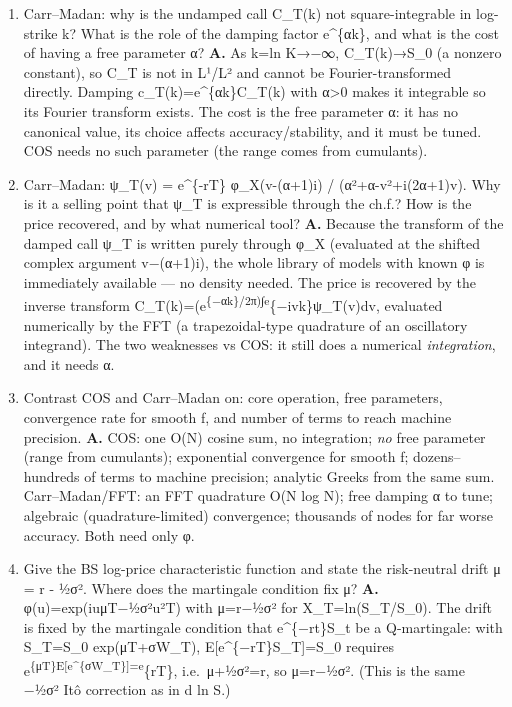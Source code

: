 \documentclass[
  11pt,
]{article}
\begin{document}
\begin{enumerate}
  the even extension. Why does the even extension kill the sine terms?
  \textbf{A.} A function on {[}0,L{]} has a full Fourier series with sin
  and cos terms. Extending it \emph{evenly} to {[}−L,L{]} makes it an
  even function; since sin is odd, all sine coefficients b\_n=(2/L)∫f
  sin vanish, leaving the half-range cosine series f(x)=a\_0/2+Σ a\_n
  cos(nπx/L), a\_n=(2/L)∫\_0\^{}L f cos(nπx/L)dx. COS uses this on
  {[}a,b{]} (shift x↦x−a, period 2(b−a)); the cosine basis gives real
  coefficients read directly off φ.
\item
  Carr--Madan: why is the undamped call C\_T(k) not square-integrable in
  log-strike k? What is the role of the damping factor e\^{}\{αk\}, and
  what is the cost of having a free parameter α? \textbf{A.} As k=ln
  K→−∞, C\_T(k)→S\_0 (a nonzero constant), so C\_T is not in L¹/L² and
  cannot be Fourier-transformed directly. Damping
  c\_T(k)=e\^{}\{αk\}C\_T(k) with α\textgreater0 makes it integrable so
  its Fourier transform exists. The cost is the free parameter α: it has
  no canonical value, its choice affects accuracy/stability, and it must
  be tuned. COS needs no such parameter (the range comes from
  cumulants).
\item
  Carr--Madan: ψ\_T(v) = e\^{}\{-rT\} φ\_X(v-(α+1)i) /
  (α²+α-v²+i(2α+1)v). Why is it a selling point that ψ\_T is expressible
  through the ch.f.? How is the price recovered, and by what numerical
  tool? \textbf{A.} Because the transform of the damped call ψ\_T is
  written purely through φ\_X (evaluated at the shifted complex argument
  v−(α+1)i), the whole library of models with known φ is immediately
  available --- no density needed. The price is recovered by the inverse
  transform C\_T(k)=(e\textsuperscript{\{−αk\}/2π)∫e}\{−ivk\}ψ\_T(v)dv,
  evaluated numerically by the FFT (a trapezoidal-type quadrature of an
  oscillatory integrand). The two weaknesses vs COS: it still does a
  numerical \emph{integration}, and it needs α.
\item
  Contrast COS and Carr--Madan on: core operation, free parameters,
  convergence rate for smooth f, and number of terms to reach machine
  precision. \textbf{A.} COS: one O(N) cosine sum, no integration;
  \emph{no} free parameter (range from cumulants); exponential
  convergence for smooth f; dozens--hundreds of terms to machine
  precision; analytic Greeks from the same sum. Carr--Madan/FFT: an FFT
  quadrature O(N log N); free damping α to tune; algebraic
  (quadrature-limited) convergence; thousands of nodes for far worse
  accuracy. Both need only φ.
\item
  Give the BS log-price characteristic function and state the
  risk-neutral drift μ = r - ½σ². Where does the martingale condition
  fix μ? \textbf{A.} φ(u)=exp(iuμT−½σ²u²T) with μ=r−½σ² for
  X\_T=ln(S\_T/S\_0). The drift is fixed by the martingale condition
  that e\^{}\{−rt\}S\_t be a Q-martingale: with S\_T=S\_0 exp(μT+σW\_T),
  E{[}e\^{}\{−rT\}S\_T{]}=S\_0 requires
  e\textsuperscript{\{μT\}E{[}e\^{}\{σW\_T\}{]}=e}\{rT\}, i.e.~μ+½σ²=r,
  so μ=r−½σ². (This is the same −½σ² Itô correction as in d ln S.)
\end{enumerate}
\end{document}
